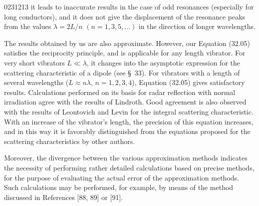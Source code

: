 \begin{scanpage}{0231}{213}
\noindent it leads to inaccurate results in the case of odd resonances (especially for long conductors), and it does not give the displacement of the resonance peaks from the values $\lambda=2L/n$ $(n=1,3,5,\ldots)$ in the direction of longer wavelengths.

The results obtained by us are also approximate. However, our Equation (32.05) satisfies the reciprocity principle, and is applicable for any length vibrator. For very short vibrators $L\ll\lambda$, it changes into the asymptotic expression for the scattering characteristic of a dipole (see \S\ 33). For vibrators with a length of several wavelengths ($L\approx n\lambda$, $n=1,2,3,4$), Equation (32.05) gives satisfactory results. Calculations performed on its basis for radar reflection with normal irradiation agree with the results of Lindroth. Good agreement is also observed with the results of Leontovich and Levin for the integral scattering characteristic. With an increase of the vibrator's length, the precision of this equation increases, and in this way it is favorably distinguished from the equations proposed for the scattering characteristics by other authors.

Moreover, the divergence between the various approximation methods indicates the necessity of performing rather detailed calculations based on precise methods, for the purpose of evaluating the actual error of the approximation methods. Such calculations may be performed, for example, by means of the method discussed in References [88, 89] or [91].
\end{scanpage}
